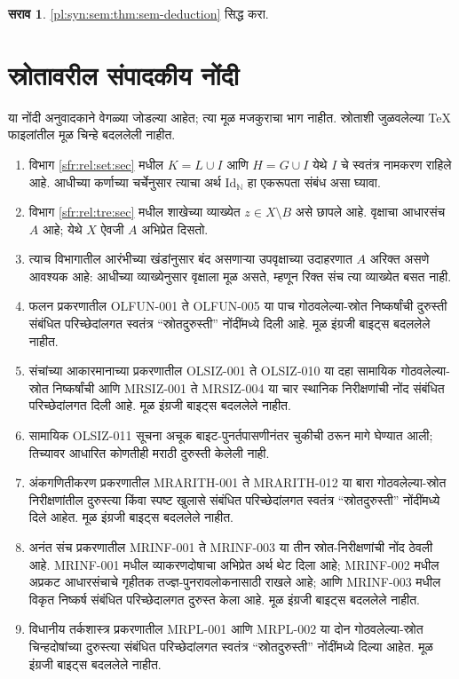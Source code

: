 \documentclass[11pt,a4paper,openany]{book}
\theoremstyle{definition}
\newtheorem{prob}{सराव}[chapter]
\newcommand{\Nat}{\mathbb{N}}
\newcommand{\Id}[1]{\mathord{\mathrm{Id}_{#1}}}
\begin{document}
\begin{prob}
\ref{pl:syn:sem:thm:sem-deduction} सिद्ध करा.
\end{prob}



\chapter*{स्रोतावरील संपादकीय नोंदी}
या नोंदी अनुवादकाने वेगळ्या जोडल्या आहेत; त्या मूळ मजकुराचा भाग नाहीत.
स्रोताशी जुळवलेल्या TeX फाइलांतील मूळ चिन्हे बदललेली नाहीत.
\begin{enumerate}
\item विभाग \ref{sfr:rel:set:sec} मधील $K=L\cup I$ आणि $H=G\cup I$ येथे
$I$ चे स्वतंत्र नामकरण राहिले आहे. आधीच्या कर्णाच्या चर्चेनुसार त्याचा अर्थ
$\Id{\Nat}$ हा एकरूपता संबंध असा घ्यावा.
\item विभाग \ref{sfr:rel:tre:sec} मधील शाखेच्या व्याख्येत $z\in X\setminus B$
असे छापले आहे. वृक्षाचा आधारसंच $A$ आहे; येथे $X$ ऐवजी $A$ अभिप्रेत दिसतो.
\item त्याच विभागातील आरंभीच्या खंडांनुसार बंद असणाऱ्या उपवृक्षाच्या उदाहरणात
$A$ अरिक्त असणे आवश्यक आहे: आधीच्या व्याख्येनुसार वृक्षाला मूळ असते,
म्हणून रिक्त संच त्या व्याख्येत बसत नाही.
\item फलन प्रकरणातील OLFUN-001 ते OLFUN-005 या पाच
गोठवलेल्या-स्रोत निष्कर्षांची दुरुस्ती संबंधित परिच्छेदांलगत स्वतंत्र
``स्रोतदुरुस्ती'' नोंदींमध्ये दिली आहे. मूळ इंग्रजी बाइट्स बदललेले नाहीत.
\item संचांच्या आकारमानाच्या प्रकरणातील OLSIZ-001 ते OLSIZ-010
या दहा सामायिक गोठवलेल्या-स्रोत निष्कर्षांची आणि MRSIZ-001 ते MRSIZ-004
या चार स्थानिक निरीक्षणांची नोंद संबंधित परिच्छेदांलगत दिली आहे. मूळ
इंग्रजी बाइट्स बदललेले नाहीत.
\item सामायिक OLSIZ-011 सूचना अचूक बाइट-पुनर्तपासणीनंतर चुकीची ठरून
मागे घेण्यात आली; तिच्यावर आधारित कोणतीही मराठी दुरुस्ती केलेली नाही.
\item अंकगणितीकरण प्रकरणातील MRARITH-001 ते MRARITH-012 या बारा
गोठवलेल्या-स्रोत निरीक्षणांतील दुरुस्त्या किंवा स्पष्ट खुलासे संबंधित
परिच्छेदांलगत स्वतंत्र ``स्रोतदुरुस्ती'' नोंदींमध्ये दिले आहेत. मूळ
इंग्रजी बाइट्स बदललेले नाहीत.
\item अनंत संच प्रकरणातील MRINF-001 ते MRINF-003 या तीन स्रोत-निरीक्षणांची
नोंद ठेवली आहे. MRINF-001 मधील व्याकरणदोषाचा अभिप्रेत अर्थ थेट दिला आहे;
MRINF-002 मधील अप्रकट आधारसंचाचे गृहीतक तज्ज्ञ-पुनरावलोकनासाठी राखले आहे;
आणि MRINF-003 मधील विकृत निष्कर्ष संबंधित परिच्छेदालगत दुरुस्त केला आहे.
मूळ इंग्रजी बाइट्स बदललेले नाहीत.
\item विधानीय तर्कशास्त्र प्रकरणातील MRPL-001 आणि MRPL-002 या दोन
गोठवलेल्या-स्रोत चिन्हदोषांच्या दुरुस्त्या संबंधित परिच्छेदांलगत स्वतंत्र
``स्रोतदुरुस्ती'' नोंदींमध्ये दिल्या आहेत. मूळ इंग्रजी बाइट्स बदललेले नाहीत.
\end{enumerate}
\end{document}
